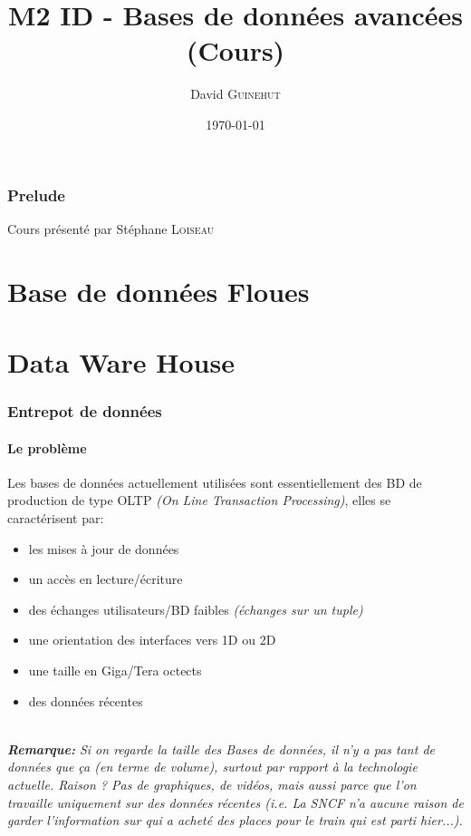 \documentclass[a4paper,11pt]{article}
\title{M2 ID - Bases de données avancées \\ \normalsize (Cours)}
\author{David \textsc{Guinehut}}
\date{\today}
\begin{document}
	\renewcommand{\headrulewidth}{0.001pt}
	
	\pagestyle{fancy}
	
	\maketitle

	\tableofcontents

\section*{Prelude}
Cours présenté par Stéphane \textsc{Loiseau}

\part{Base de données Floues}


\part{Data Ware House}
\section{Entrepot de données}
\subsection{Le problème}
	Les bases de données actuellement utilisées sont essentiellement des BD de production de type OLTP \emph{(On Line Transaction Processing)}, elles se caractérisent par:
	\begin{itemize}
		\item les mises à jour de données 
		\item un accès en lecture/écriture
		\item des échanges utilisateurs/BD faibles \emph{(échanges sur un tuple)}
		\item une orientation des interfaces vers 1D ou 2D
		\item une taille en Giga/Tera octects
		\item des données récentes
	\end{itemize}
	~\\

\emph{\textbf{Remarque:} Si on regarde la taille des Bases de données, il n'y a pas tant de données que ça (en terme de volume), surtout par rapport à la technologie actuelle. Raison ? Pas de graphiques, de vidéos, mais aussi parce que l'on travaille uniquement sur des données récentes (i.e. La SNCF n'a aucune raison de garder l'information sur qui a acheté des places pour le train qui est parti hier...).}	\\
		
\end{document}
